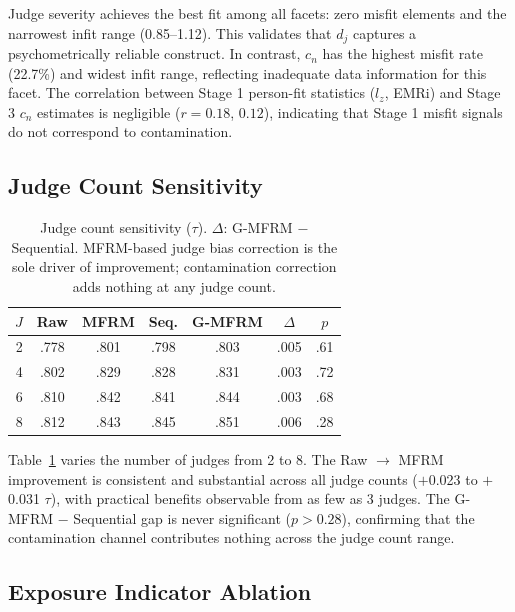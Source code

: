 \documentclass[11pt]{article}
\begin{document}
Judge severity achieves the best fit among all facets: zero misfit elements and the narrowest infit range (0.85--1.12). This validates that $d_j$ captures a psychometrically reliable construct. In contrast, $c_n$ has the highest misfit rate (22.7\%) and widest infit range, reflecting inadequate data information for this facet. The correlation between Stage 1 person-fit statistics ($l_z$, EMRi) and Stage 3 $c_n$ estimates is negligible ($r = 0.18$, $0.12$), indicating that Stage 1 misfit signals do not correspond to contamination.

\subsection{Judge Count Sensitivity}
\label{sec:judge_count}

\begin{table}[t]
\centering
\small
\begin{tabular}{rcccccc}
\toprule
$J$ & Raw & MFRM & Seq. & G-MFRM & $\Delta$ & $p$ \\
\midrule
2 & .778 & .801 & .798 & .803 & .005 & .61 \\
4 & .802 & .829 & .828 & .831 & .003 & .72 \\
6 & .810 & .842 & .841 & .844 & .003 & .68 \\
8 & .812 & .843 & .845 & .851 & .006 & .28 \\
\bottomrule
\end{tabular}
\caption{Judge count sensitivity ($\tau$). $\Delta$: G-MFRM $-$ Sequential. MFRM-based judge bias correction is the sole driver of improvement; contamination correction adds nothing at any judge count.}
\label{tab:judge_count}
\end{table}

Table~\ref{tab:judge_count} varies the number of judges from 2 to 8. The Raw $\rightarrow$ MFRM improvement is consistent and substantial across all judge counts ($+$0.023 to $+$0.031 $\tau$), with practical benefits observable from as few as 3 judges. The G-MFRM $-$ Sequential gap is never significant ($p > 0.28$), confirming that the contamination channel contributes nothing across the judge count range.

\subsection{Exposure Indicator Ablation}
\label{sec:ablation}
\end{document}
